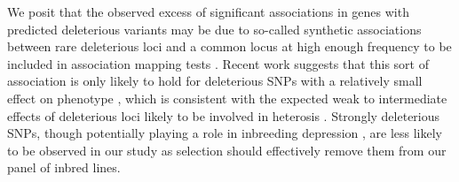 \documentclass[12pt]{article}
\begin{document}
We posit that the observed excess of significant associations in genes with predicted deleterious variants may be due to so-called synthetic associations between rare deleterious loci and a common locus at high enough frequency to be included in association mapping tests \citep{Dickson2010,Goldstein2009}. Recent work suggests that this sort of association is only likely to hold for deleterious SNPs with a relatively small effect on phenotype \citep{Thornton2013}, which is consistent with the expected weak to intermediate effects of  deleterious loci likely to be involved in heterosis \citep{Charlesworth1987,Whitlock2000,Glemin2003,Charlesworth2009}. Strongly deleterious SNPs, though potentially playing a role in inbreeding depression \citep{Whitlock2000}, are less likely to be observed in our study as selection should effectively remove them from our panel of inbred lines.  
\end{document}
